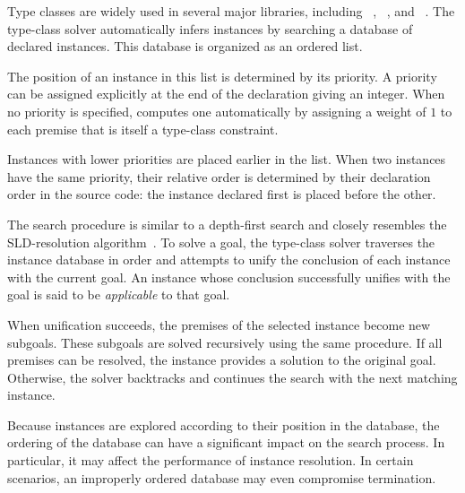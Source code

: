 

% 


Type classes are widely used in several major \rocq{} libraries, including
\tlc~\cite{tlc}, \stdpp~\cite{stdpp}, and \iris~\cite{iris-junk}. The
type-class solver automatically infers instances by searching a database
of declared instances. This database is organized as an ordered list.

The position of an instance in this list is determined by its priority.
A priority can be assigned explicitly at the end of the declaration
giving an integer. When no priority is
specified, \rocq{} computes one automatically by assigning a weight of
$1$ to each premise that is itself a type-class constraint.

Instances with lower priorities are placed earlier in the list. When two instances
have the same priority, their relative order is determined by their
declaration order in the source code: the instance declared first is
placed before the other.

The search procedure is similar to a depth-first search and closely resembles
the \prolog{} SLD-resolution algorithm~\cite{sld}. To solve a goal, the
type-class solver traverses the instance database in order and attempts to unify
the conclusion of each instance with the current goal. An instance whose
conclusion successfully unifies with the goal is said to be \emph{applicable} to
that goal.

When unification succeeds, the premises of the selected instance become
new subgoals. These subgoals are solved recursively using the same
procedure. If all premises can be resolved, the instance provides a
solution to the original goal. Otherwise, the solver backtracks and
continues the search with the next matching instance.

Because instances are explored according to their position in the database, the
ordering of the database can have a significant impact on the search process. In
particular, it may affect the performance of instance resolution. In certain
scenarios, an improperly ordered database may even compromise
termination.

